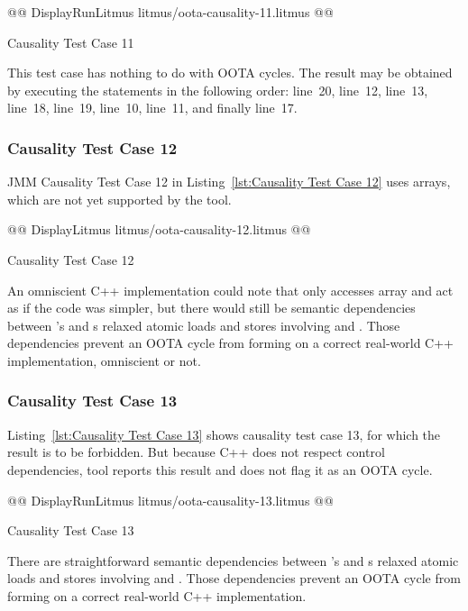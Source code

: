 \documentclass[10]{article}
\begin{document}
\begin{listing}[tbp]
@@ DisplayRunLitmus litmus/oota-causality-11.litmus @@
\caption{Causality Test Case 11}
\label{lst:Causality Test Case 11}
\end{listing}

This test case has nothing to do with OOTA cycles.
The result may be obtained by executing the statements in the following
order: line~20, line~12, line~13, line~18, line~19, line~10, line~11,
and finally line~17.

\subsubsection{Causality Test Case 12}
\label{app:Causality Test Case 12}

JMM Causality Test Case 12 in
Listing~\ref{lst:Causality Test Case 12}
uses arrays, which are not yet supported by the  tool.

\begin{listing}[tbp]
@@ DisplayLitmus litmus/oota-causality-12.litmus @@
\caption{Causality Test Case 12}
\label{lst:Causality Test Case 12}
\end{listing}

An omniscient C++ implementation could note that only  accesses
array  and act as if the code was simpler, but there would
still be semantic dependencies between 's and s
relaxed atomic loads and stores involving  and .
Those dependencies prevent an OOTA cycle from forming on a correct
real-world C++ implementation, omniscient or not.

\subsubsection{Causality Test Case 13}
\label{app:Causality Test Case 13}

Listing~\ref{lst:Causality Test Case 13}
shows causality test case 13, for which the 
result is to be forbidden.
But because C++ does not respect control dependencies,  tool
reports this result and does not flag it as an OOTA cycle.

\begin{listing}[tbp]
@@ DisplayRunLitmus litmus/oota-causality-13.litmus @@
\caption{Causality Test Case 13}
\label{lst:Causality Test Case 13}
\end{listing}

There are straightforward semantic dependencies between 's and
s relaxed atomic loads and stores involving  and .
Those dependencies prevent an OOTA cycle from forming on a correct
real-world C++ implementation.
\end{document}
